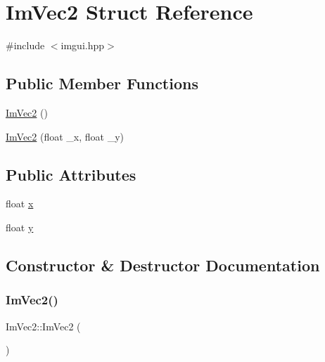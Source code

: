 \hypertarget{struct_im_vec2}{}\section{Im\+Vec2 Struct Reference}
\label{struct_im_vec2}


{\ttfamily \#include $<$imgui.\+hpp$>$}

\subsection*{Public Member Functions}
\begin{DoxyCompactItemize}
\item 
\hyperlink{struct_im_vec2_a5dfa5ab27cc4af6df3cf8d920fc8a294}{Im\+Vec2} ()
\item 
\hyperlink{struct_im_vec2_af2fd51a6c4bf6290676b235533b92c0d}{Im\+Vec2} (float \+\_\+x, float \+\_\+y)
\end{DoxyCompactItemize}
\subsection*{Public Attributes}
\begin{DoxyCompactItemize}
\item 
float \hyperlink{struct_im_vec2_a5802a68560961ed8cb8cc5fb2a244c2d}{x}
\item 
float \hyperlink{struct_im_vec2_a1f9d136ca837e147b793b19d25a3a618}{y}
\end{DoxyCompactItemize}


\subsection{Constructor \& Destructor Documentation}
\hypertarget{struct_im_vec2_a5dfa5ab27cc4af6df3cf8d920fc8a294}{}\label{struct_im_vec2_a5dfa5ab27cc4af6df3cf8d920fc8a294} 
\subsubsection{\texorpdfstring{Im\+Vec2()}{ImVec2()}\hspace{0.1cm}{\footnotesize\ttfamily [1/2]}}
{\footnotesize\ttfamily Im\+Vec2\+::\+Im\+Vec2 (\begin{DoxyParamCaption}{ }\end{DoxyParamCaption})}

\hypertarget{struct_im_vec2_af2fd51a6c4bf6290676b235533b92c0d}{}\label{struct_im_vec2_af2fd51a6c4bf6290676b235533b92c0d} 
